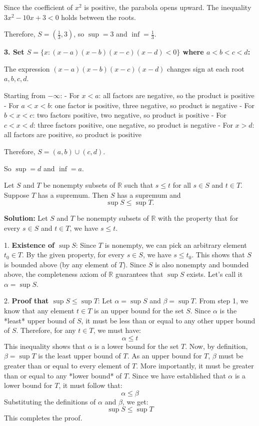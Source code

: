 Since the coefficient of $x^2$ is positive, the parabola opens upward. The inequality $3x^2 - 10x + 3 < 0$ holds between the roots.

Therefore, $S = (\frac{1}{3}, 3)$, so $\sup = 3$ and $\inf = \frac{1}{3}$.

\textbf{3. Set $S = \{x : (x - a)(x - b)(x - c)(x - d) < 0\}$ where $a < b < c < d$:}

The expression $(x - a)(x - b)(x - c)(x - d)$ changes sign at each root $a, b, c, d$.

Starting from $-\infty$:
- For $x < a$: all factors are negative, so the product is positive
- For $a < x < b$: one factor is positive, three negative, so product is negative
- For $b < x < c$: two factors positive, two negative, so product is positive
- For $c < x < d$: three factors positive, one negative, so product is negative
- For $x > d$: all factors are positive, so product is positive

Therefore, $S = (a, b) \cup (c, d)$.

So $\sup = d$ and $\inf = a$.

\begin{problembox}
Let \( S \) and \( T \) be nonempty subsets of \( \mathbb{R} \) such that \( s \leq t \) for all \( s \in S \) and \( t \in T \). Suppose \( T \) has a supremum. Then \( S \) has a supremum and
\[
\sup S \leq \sup T.
\]
\end{problembox}

\textbf{Solution:}
Let $S$ and $T$ be nonempty subsets of $\mathbb{R}$ with the property that for every $s \in S$ and $t \in T$, we have $s \leq t$.

1.  \textbf{Existence of $\sup S$}:
Since $T$ is nonempty, we can pick an arbitrary element $t_0 \in T$. By the given property, for every $s \in S$, we have $s \leq t_0$. This shows that $S$ is bounded above (by any element of $T$). Since $S$ is also nonempty and bounded above, the completeness axiom of $\mathbb{R}$ guarantees that $\sup S$ exists. Let's call it $\alpha = \sup S$.

2.  \textbf{Proof that $\sup S \leq \sup T$}:
Let $\alpha = \sup S$ and $\beta = \sup T$.
From step 1, we know that any element $t \in T$ is an upper bound for the set $S$.
Since $\alpha$ is the *least* upper bound of $S$, it must be less than or equal to any other upper bound of $S$. Therefore, for any $t \in T$, we must have:
\[
\alpha \leq t
\]
This inequality shows that $\alpha$ is a lower bound for the set $T$.
Now, by definition, $\beta = \sup T$ is the least upper bound of $T$. As an upper bound for $T$, $\beta$ must be greater than or equal to every element of $T$. More importantly, it must be greater than or equal to any *lower bound* of $T$.
Since we have established that $\alpha$ is a lower bound for $T$, it must follow that:
\[
\alpha \leq \beta
\]
Substituting the definitions of $\alpha$ and $\beta$, we get:
\[
\sup S \leq \sup T
\]
This completes the proof.

